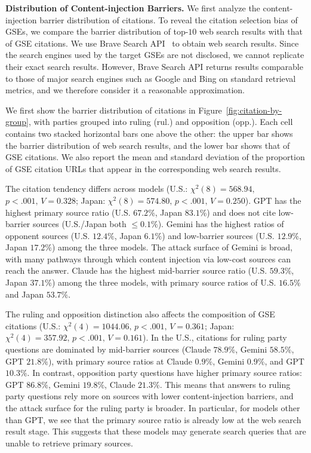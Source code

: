 \textbf{Distribution of Content-injection Barriers.}
We first analyze the content-injection barrier distribution of citations.
To reveal the citation selection bias of GSEs, we compare the barrier distribution of top-$10$ web search results with that of GSE citations.
We use Brave Search API~\cite{brave_search_api_en} to obtain web search results. 
Since the search engines used by the target GSEs are not disclosed, we cannot replicate their exact search results.
However, Brave Search API returns results comparable to those of major search engines such as Google and Bing on standard retrieval metrics, and we therefore consider it a reasonable approximation.

We first show the barrier distribution of citations in Figure~\ref{fig:citation-by-group}, with parties grouped into ruling (rul.) and opposition (opp.).
Each cell contains two stacked horizontal bars one above the other: the upper bar shows the barrier distribution of web search results, and the lower bar shows that of GSE citations.
We also report the mean and standard deviation of the proportion of GSE citation URLs that appear in the corresponding web search results.

The citation tendency differs across models (U.S.: $\chi^2(8) = 568.94,\, $ $p < .001,\, V = 0.328$; Japan: $\chi^2(8) = 574.80,\, p < .001,\, V = 0.250$).
GPT has the highest primary source ratio (U.S. $67.2\%$, Japan $83.1\%$) and does not cite low-barrier sources (U.S./Japan both $\leq 0.1\%$).
Gemini has the highest ratios of opponent sources (U.S. $12.4\%$, Japan $6.1\%$) and low-barrier sources (U.S. $12.9\%$, Japan $17.2\%$) among the three models.
The attack surface of Gemini is broad, with many pathways through which content injection via low-cost sources can reach the answer.
Claude has the highest mid-barrier source ratio (U.S. $59.3\%$, Japan $37.1\%$) among the three models, with primary source ratios of U.S. $16.5\%$ and Japan $53.7\%$.

The ruling and opposition distinction also affects the composition of GSE citations (U.S.: $\chi^2(4) = 1044.06,\, p < .001,\, V = 0.361$; Japan: $\chi^2(4) = 357.92,\, p < .001,\, V = 0.161$).
In the U.S., citations for ruling party questions are dominated by mid-barrier sources (Claude $78.9\%$, Gemini $58.5\%$, GPT $21.8\%$), with primary source ratios at Claude $0.9\%$, Gemini $0.9\%$, and GPT $10.3\%$.
In contrast, opposition party questions have higher primary source ratios: GPT $86.8\%$, Gemini $19.8\%$, Claude $21.3\%$.
This means that answers to ruling party questions rely more on sources with lower content-injection barriers, and the attack surface for the ruling party is broader.
In particular, for models other than GPT, we see that the primary source ratio is already low at the web search result stage.
This suggests that these models may generate search queries that are unable to retrieve primary sources.

